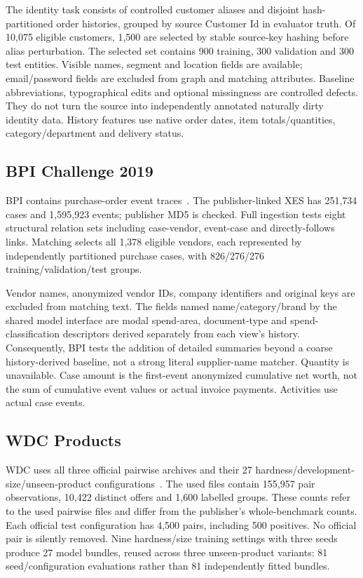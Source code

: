 \documentclass[11pt,letterpaper]{article}
\begin{document}
The identity task consists of controlled customer aliases and disjoint hash-partitioned order histories, grouped by source Customer Id in evaluator truth. Of 10,075 eligible customers, 1,500 are selected by stable source-key hashing before alias perturbation. The selected set contains 900 training, 300 validation and 300 test entities. Visible names, segment and location fields are available; email/password fields are excluded from graph and matching attributes. Baseline abbreviations, typographical edits and optional missingness are controlled defects. They do not turn the source into independently annotated naturally dirty identity data. History features use native order dates, item totals/quantities, category/department and delivery status.

\subsection{BPI Challenge 2019}
BPI contains purchase-order event traces~\cite{bpi}. The publisher-linked XES has 251,734 cases and 1,595,923 events; publisher MD5 is checked. Full ingestion tests eight structural relation sets including case-vendor, event-case and directly-follows links. Matching selects all 1,378 eligible vendors, each represented by independently partitioned purchase cases, with 826/276/276 training/validation/test groups.

Vendor names, anonymized vendor IDs, company identifiers and original keys are excluded from matching text. The fields named name/category/brand by the shared model interface are modal spend-area, document-type and spend-classification descriptors derived separately from each view's history. Consequently, BPI tests the addition of detailed summaries beyond a coarse history-derived baseline, not a strong literal supplier-name matcher. Quantity is unavailable. Case amount is the first-event anonymized cumulative net worth, not the sum of cumulative event values or actual invoice payments. Activities use actual case events.

\subsection{WDC Products}
WDC uses all three official pairwise archives and their 27 hardness/development-size/unseen-product configurations~\cite{wdc,wdcsite}. The used files contain 155,957 pair observations, 10,422 distinct offers and 1,600 labelled groups. These counts refer to the used pairwise files and differ from the publisher's whole-benchmark counts. Each official test configuration has 4,500 pairs, including 500 positives. No official pair is silently removed. Nine hardness/size training settings with three seeds produce 27 model bundles, reused across three unseen-product variants: 81 seed/configuration evaluations rather than 81 independently fitted bundles.
\end{document}
